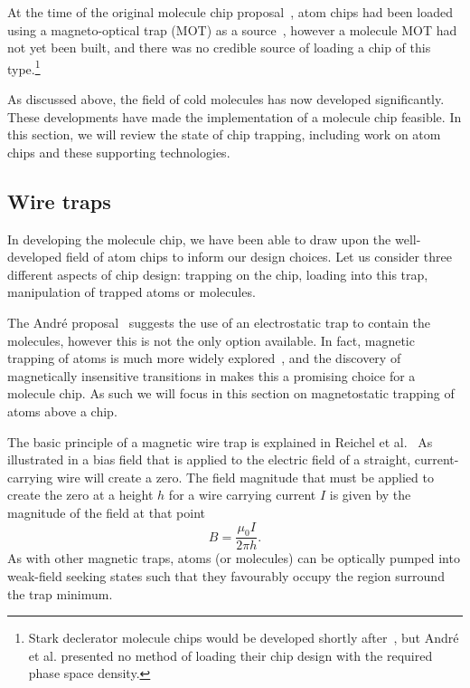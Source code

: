 
At the time of the original molecule chip proposal~\cite{Andre2006}, atom chips
had been loaded using a magneto-optical trap (MOT) as a
source~\cite{Reichel1999, Ott2001}, however a molecule MOT had not yet been
built, and there was no credible source of loading a chip of this
type.\footnote{Stark declerator molecule chips would be developed shortly
after~\cite{Meek1699}, but Andr\'e et al. presented no method of loading their
chip design with the required phase space density.}  

As discussed above, the field of cold molecules has now developed significantly.
These developments have made the implementation of a molecule chip feasible. In
this section, we will review the state of chip trapping, including work on atom
chips and these supporting technologies.

\subsection{Wire traps}
\label{litrev:wiretraps}

In developing the molecule chip, we have been able to draw upon the
well-developed field of atom chips to inform our design choices. Let us consider
three different aspects of chip design: trapping on the chip, loading into this
trap, manipulation of trapped atoms or molecules.

The Andr\'e proposal~\cite{Andre2006} suggests the use of an electrostatic trap
to contain the molecules, however this is not the only option available. In
fact, magnetic trapping of atoms is much more widely explored~\cite{2011Ac},
and the discovery of magnetically insensitive transitions in \CaF{} makes this a
promising choice for a molecule chip. As such we will focus in this section on
magnetostatic trapping of atoms above a chip.

The basic principle of a magnetic wire trap is explained in Reichel et
al.~\cite{Reichel1999} As illustrated in  a
bias field that is applied to the electric field of a straight, current-carrying
wire will create a zero. The field magnitude that must be applied to create the
zero at a height $h$ for a wire carrying current $I$ is given by the magnitude
of the field at that point~\cite{Jackson1975}
%
\begin{equation}
  B = \frac{\mu_0 I}{2\pi h}.
  \label{litrev:eqn:bias}
\end{equation}
%
As with other magnetic traps, atoms (or molecules) can be optically pumped into
weak-field seeking states such that they favourably occupy the region surround
the trap minimum.~\cite{Metcalf1999}

